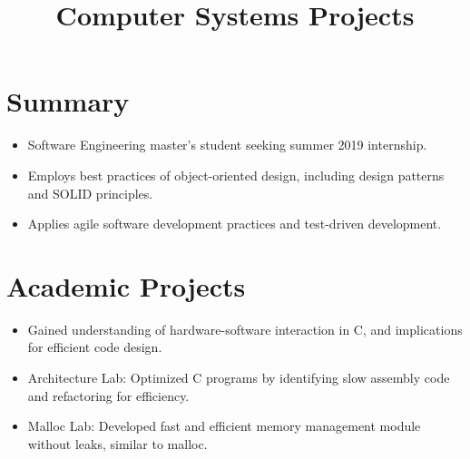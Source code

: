 \documentclass[12pt]{res} %
\begin{document}
    \begin{resume}
 
      \section{Summary}
      \begin{itemize}[leftmargin=-0.4cm, rightmargin=0.8cm]
        \itemsep0em
        \item Software Engineering master's student seeking summer 2019 internship.
        \item Employs best practices of object-oriented design, including design patterns and SOLID principles.
        \item Applies agile software development practices and test-driven development.
        \end{itemize}
        \vspace{-10pt}
      
        \section{Academic Projects}
          \vspace{2pt}

          \title{\textbf{Computer Systems Projects}}
          \begin{position}
            \vspace{-14pt}
            \begin{itemize}[leftmargin=-0.4cm, rightmargin=0.8cm]            %
            \itemsep0em
            \item Gained understanding of hardware-software interaction in C, and implications for efficient code design.
            \item Architecture Lab: Optimized C programs by identifying slow assembly code and refactoring for efficiency.
            \item Malloc Lab: Developed fast and efficient memory management module without leaks, similar to malloc.
            \end{itemize}
          \end{position}
          \vspace{-10pt}


\end{resume}
\end{document}

